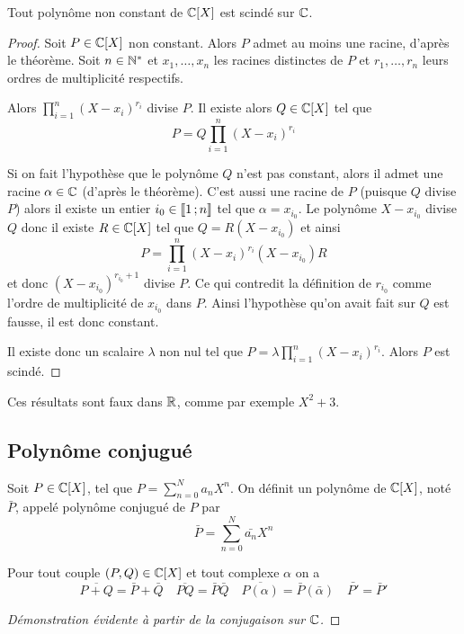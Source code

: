 \begin{cor}
  Tout polynôme non constant de $\mathbb{C}[X]$ est scindé sur $\mathbb{C}$.
\end{cor}
\begin{proof}
  Soit $P \in \mathbb{C}[X]$ non constant. Alors $P$ admet au moins une racine, d'après le théorème. Soit $n \in \mathbb{N}^*$ et $x_1, \ldots, x_n$ les racines distinctes de $P$ et $r_1, \ldots, r_n$ leurs ordres de multiplicité respectifs.

  Alors $\prod_{i=1}^n (X-x_i)^{r_i}$ divise $P$. Il existe alors $Q \in \mathbb{C}[X]$ tel que
  \begin{equation}
    P = Q \prod_{i=1}^n (X-x_i)^{r_i}
  \end{equation}
  
Si on fait l'hypothèse que le polynôme $Q$ n'est pas constant, alors il admet une racine $\alpha \in \mathbb{C}$ (d'après le théorème). C'est aussi une racine de $P$ (puisque $Q$ divise $P$) alors il existe un entier $i_0 \in \mathopen{\llbracket}1\mathclose{}\mathpunct{};n\mathclose{\rrbracket}$ tel que $\alpha=x_{i_0}$.
  Le polynôme $X-x_{i_0}$ divise $Q$ donc il existe $R \in \mathbb{C}[X]$ tel que $Q=R(X-x_{i_0})$ et ainsi
  \begin{equation}
    P = \prod_{i=1}^n (X-x_i)^{r_i} (X-x_{i_0}) R
  \end{equation}
  et donc $(X-x_{i_0})^{r_{i_0}+1}$ divise $P$. Ce qui contredit la définition de $r_{i_0}$ comme l'ordre de multiplicité de $x_{i_0}$ dans $P$. Ainsi l'hypothèse qu'on avait fait sur $Q$ est fausse, il est donc constant.

  Il existe donc un scalaire $\lambda$ non nul tel que $P=\lambda \prod_{i=1}^n (X-x_i)^{r_i}$. Alors $P$ est scindé.
\end{proof}

\danger \danger Ces résultats sont faux dans $\mathbb{R}$, comme par exemple $X^2+3$.

\subsection{Polynôme conjugué}

\begin{defdef}
  Soit $P \in \mathbb{C}[X]$, tel que $P = \sum_{n=0}^N a_n X^n$. On définit un polynôme de $\mathbb{C}[X]$, noté $\bar{P}$, appelé polynôme conjugué de $P$ par
  \begin{equation}
    \bar{P} = \sum_{n=0}^N \bar{a_n} X^n
  \end{equation}
\end{defdef}

\begin{prop}
  Pour tout couple $(P,Q) \in \mathbb{C}[X]$ et tout complexe $\alpha$ on a
  \begin{equation}
    \overline{P+Q}=\bar{P}+\bar{Q} \quad \overline{PQ}=\bar{P}\bar{Q} \quad \overline{P(\alpha)} = \bar{P}(\bar{\alpha}) \quad \bar{P'}=\bar{P}'
  \end{equation}
\end{prop}
\begin{proof}[Démonstration évidente à partir de la conjugaison sur $\mathbb{C}$]
\end{proof}

